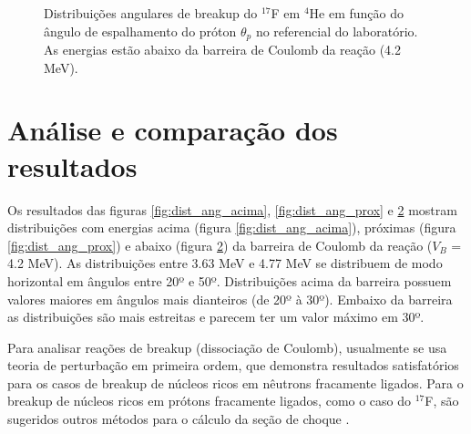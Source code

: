 \documentclass[a4paper,12pt,oneside]{book}
\begin{document}
\begin{figure}[H]
\begin{subfigure}[b]{0.48\textwidth}
        \caption{}
        \label{subfig:dist_ang_ab}
    \end{subfigure}
\caption{Distribuições angulares de breakup do $^{17}$F em $^4$He em função do ângulo de espalhamento do próton $\theta_p$ no referencial do laboratório. As energias estão abaixo da barreira de Coulomb da reação (4.2 MeV).}
\label{fig:dist_ang_abaixo}
\end{figure}
\section{Análise e comparação dos resultados}

\par Os resultados das figuras \ref{fig:dist_ang_acima}, \ref{fig:dist_ang_prox} e \ref{fig:dist_ang_abaixo} mostram distribuições com energias acima (figura \ref{fig:dist_ang_acima}), próximas (figura \ref{fig:dist_ang_prox}) e abaixo (figura \ref{fig:dist_ang_abaixo}) da barreira de Coulomb da reação ($V_B$ = 4.2 MeV). As distribuições entre 3.63 MeV e 4.77 MeV se distribuem de modo horizontal em ângulos entre 20º e 50º. Distribuições acima da barreira possuem valores maiores em ângulos mais dianteiros (de 20º à 30º). Embaixo da barreira as distribuições são mais estreitas e parecem ter um valor máximo em 30º.

\par Para analisar reações de breakup (dissociação de Coulomb), usualmente se usa teoria de perturbação em primeira ordem, que demonstra resultados satisfatórios para os casos de breakup de núcleos ricos em nêutrons fracamente ligados. Para o breakup de núcleos ricos em prótons fracamente ligados, como o caso do $^{17}$F, são sugeridos outros métodos para o cálculo da seção de choque \cite{LIANG200922, BERTULANI2003199}.
\end{document}
